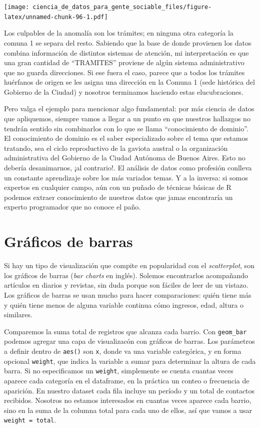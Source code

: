 \documentclass[]{book}
\begin{document}
\texttt{[image: ciencia\_de\_datos\_para\_gente\_sociable\_files/figure-latex/unnamed-chunk-96-1.pdf]}

Los culpables de la anomalía son los trámites; en ninguna otra categoría
la comuna 1 se separa del resto. Sabiendo que la base de donde provienen
los datos combina información de distintos sistemas de atención, mi
interpretación es que una gran cantidad de ``TRAMITES'' proviene de
algún sistema administrativo que no guarda direcciones. Si ese fuera el
caso, parece que a todos los trámites huérfanos de origen se les asigna
una dirección en la Comuna 1 (sede histórica del Gobierno de la Ciudad)
y nosotros terminamos haciendo estas elucubraciones.

Pero valga el ejemplo para mencionar algo fundamental: por más ciencia
de datos que apliquemos, siempre vamos a llegar a un punto en que
nuestros hallazgos no tendrán sentido sin combinarlos con lo que se
llama ``conocimiento de dominio''. El conocimiento de dominio es el
saber especializado sobre el tema que estamos tratando, sea el ciclo
reproductivo de la gaviota austral o la organización administrativa del
Gobierno de la Ciudad Autónoma de Buenos Aires. Esto no debería
desanimarnos, ¡al contrario!. El análisis de datos como profesión
conlleva un constante aprendizaje sobre los más variados temas. Y a la
inversa: si somos expertos en cualquier campo, aún con un puñado de
técnicas básicas de R podemos extraer conocimiento de nuestros datos que
jamas encontraría un experto programador que no conoce el paño.

\section{Gráficos de barras}\label{graficos-de-barras}

Si hay un tipo de visualización que compite en popularidad con el
\emph{scatterplot}, son los gráficos de barras (\emph{bar charts} en
inglés). Solemos encontrarlos acompañando artículos en diarios y
revistas, sin duda porque son fáciles de leer de un vistazo. Los
gráficos de barras se usan mucho para hacer comparaciones: quién tiene
más y quién tiene menos de alguna variable continua cómo ingresos, edad,
altura o similares.

Comparemos la suma total de registros que alcanza cada barrio. Con
\texttt{geom\_bar} podemos agregar una capa de visualizacón con gráficos
de barras. Los parámetros a definir dentro de \texttt{aes()} son
\texttt{x}, donde va una variable categórica, y en forma opcional
\texttt{weight}, que indica la variable a sumar para determinar la
altura de cada barra. Si no especificamos un \texttt{weight},
simplemente se cuenta cuantas veces aparece cada categoría en el
dataframe, en la práctica un conteo o frecuencia de aparición. En
nuestro dataset cada fila incluye un período y un total de contactos
recibidos. Nosotros no estamos interesados en cuantas veces aparece cada
barrio, sino en la suma de la columna total para cada uno de ellos, así
que vamos a usar \texttt{weight\ =\ total}.
\end{document}
